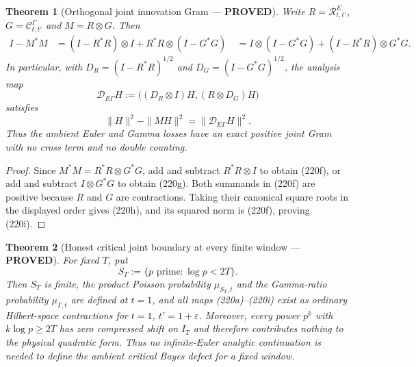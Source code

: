 \documentclass[11pt]{article}
\newtheorem{theorem}{Theorem}
\newcommand{\PROVED}{\textcolor{green!45!black}{\textbf{PROVED}}}
\begin{document}
\begin{theorem}[Orthogonal joint innovation Gram --- \PROVED]
Write $R=\mathcal R^E_{t,t'}$, $G=\mathcal C^\Gamma_{t,t'}$ and
$M=R\otimes G$.  Then
\begin{align}
 I-M^*M
 &=(I-R^*R)\otimes I
   +R^*R\otimes(I-G^*G)                               \tag{220f}\
 &=I\otimes(I-G^*G)
   +(I-R^*R)\otimes G^*G.                             \tag{220g}
\end{align}
In particular, with $D_R=(I-R^*R)^{1/2}$ and
$D_G=(I-G^*G)^{1/2}$, the analysis map
\begin{equation}
 \mathcal D_{E\Gamma}H:=
 \bigl((D_R\otimes I)H, (R\otimes D_G)H\bigr)       \tag{220h}
\end{equation}
satisfies
\begin{equation}
 \|H\|^2-\|MH\|^2=\|\mathcal D_{E\Gamma}H\|^2.
                                                               \tag{220i}
\end{equation}
Thus the ambient Euler and Gamma losses have an exact positive joint Gram
with no cross term and no double counting.
\end{theorem}

\begin{proof}
Since $M^*M=R^*R\otimes G^*G$, add and subtract $R^*R\otimes I$ to obtain
(220f), or add and subtract $I\otimes G^*G$ to obtain (220g).  Both summands
in (220f) are positive because $R$ and $G$ are contractions.  Taking their
canonical square roots in the displayed order gives (220h), and its squared
norm is (220f), proving (220i).
\end{proof}

\begin{theorem}[Honest critical joint boundary at every finite window ---
\PROVED]
For fixed $T$, put
\begin{equation}
 S_T:=\{p\text{ prime}:\log p<2T\}.                  \tag{220k}
\end{equation}
Then $S_T$ is finite, the product Poisson probability $\mu_{S_T,t}$ and the
Gamma-ratio probability $\mu_{\Gamma,t}$ are defined at $t=1$, and all maps
(220a)--(220i) exist as ordinary Hilbert-space contractions for
$t=1$, $t'=1+\varepsilon$.  Moreover, every power $p^k$ with
$k\log p\ge2T$ has zero compressed shift on $I_T$ and therefore contributes
nothing to the physical quadratic form.  Thus no infinite-Euler analytic
continuation is needed to define the \emph{ambient} critical Bayes defect for
a fixed window.
\end{theorem}
\end{document}
